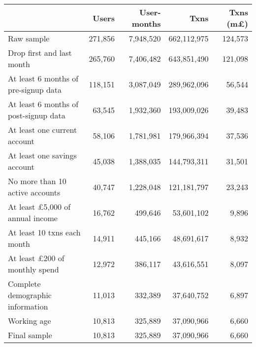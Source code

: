 \begin{tabular}{lrrrr}
\toprule
                                       &   Users & User-months &        Txns & Txns (m\pounds) \\
\midrule
                            Raw sample & 271,856 &   7,948,520 & 662,112,975 &         124,573 \\
             Drop first and last month & 265,760 &   7,406,482 & 643,851,490 &         121,098 \\
  At least 6 months of pre-signup data & 118,151 &   3,087,049 & 289,962,096 &          56,544 \\
 At least 6 months of post-signup data &  63,545 &   1,932,360 & 193,009,026 &          39,483 \\
          At least one current account &  58,106 &   1,781,981 & 179,966,394 &          37,536 \\
          At least one savings account &  45,038 &   1,388,035 & 144,793,311 &          31,501 \\
       No more than 10 active accounts &  40,747 &   1,228,048 & 121,181,797 &          23,243 \\
At least \pounds5,000 of annual income &  16,762 &     499,646 &  53,601,102 &           9,896 \\
           At least 10 txns each month &  14,911 &     445,166 &  48,691,617 &           8,932 \\
  At least \pounds200 of monthly spend &  12,972 &     386,117 &  43,616,551 &           8,097 \\
      Complete demographic information &  11,013 &     332,389 &  37,640,752 &           6,897 \\
                           Working age &  10,813 &     325,889 &  37,090,966 &           6,660 \\
                          Final sample &  10,813 &     325,889 &  37,090,966 &           6,660 \\
\bottomrule
\end{tabular}
